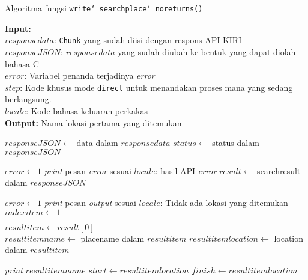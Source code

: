 \begin{algorithm}[h]
	\caption{\textendash\xspace Algoritma fungsi \texttt{write\char`_searchplace\char`_noreturns()}}
	\label{alg:design-write-searchplacenoreturns}
	\vspace{-0.6\baselineskip}
	\begin{flushleft}
		\textbf{Input:} \\
		\hspace{1.1em}\textendash\xspace $responsedata$: \texttt{Chunk} yang sudah diisi dengan respons API KIRI \\
		\hspace{1.1em}\textendash\xspace $responseJSON$: $responsedata$ yang sudah diubah ke bentuk yang dapat diolah bahasa C \\
		\hspace{1.1em}\textendash\xspace $error$: Variabel penanda terjadinya \textit{error} \\
		\hspace{1.1em}\textendash\xspace $step$: Kode khusus mode \texttt{direct} untuk menandakan proses mana yang sedang berlangsung. \\
		\hspace{1.1em}\textendash\xspace $locale$: Kode bahasa keluaran perkakas \\
		\textbf{Output:} Nama lokasi pertama yang ditemukan \\
	\end{flushleft}
	\vspace{-1.05\baselineskip}
	\begin{algorithmic}
		\State $responseJSON \gets$ data dalam $responsedata$
		\State $status \gets$ \textquotesingle\textquotesingle status\textquotesingle\textquotesingle\xspace dalam $responseJSON$
		
			\State $error \gets 1$
			\State \textit{print} pesan \textit{error} sesuai $locale$: hasil API \textit{error}
		\Else
			\State $result \gets$ \textquotesingle\textquotesingle searchresult\textquotesingle\textquotesingle\xspace dalam $responseJSON$
			
				\State $error \gets 1$
				\State \textit{print} pesan \textit{output} sesuai $locale$: Tidak ada lokasi yang ditemukan
			\Else
				\State $indexitem \gets 1$
				
				\State $resultitem \gets result[0]$ \\
				\State $resultitemname \gets$ \textquotesingle\textquotesingle placename\textquotesingle\textquotesingle\xspace dalam $resultitem$
				\State $resultitemlocation \gets$ \textquotesingle\textquotesingle location\textquotesingle\textquotesingle\xspace dalam $resultitem$
				
				\State \textit{print} $resultitemname$
					\State $start \gets resultitemlocation$
					\State $finish \gets resultitemlocation$
				\EndIf
			\EndIf
		\EndIf
	\end{algorithmic}
\end{algorithm}

